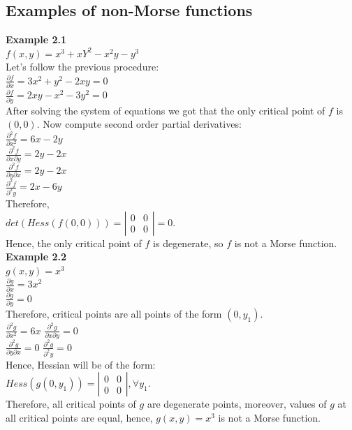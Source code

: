 \documentclass[]{article}
\begin{document}
\subsection{Examples of non-Morse functions} 
\textbf{Example 2.1}\\
$f(x,y)=x^3+xY^2-x^2y-y^3$\\
Let's follow the previous procedure: \\
$\frac{\partial f}{\partial x}=3x^2+y^2-2xy=0$\\
$\frac{\partial f}{\partial y}=2xy-x^2-3y^2=0$\\
After solving the system of equations we got that the only critical point of $f$ is $(0,0)$. Now compute second order partial derivatives:\\
$\frac{\partial^2 f}{\partial x^2}=6x-2y$\\
$\frac{\partial^2 f}{\partial x \partial y}=2y-2x$\\
$\frac{\partial^2 f}{\partial y \partial x}=2y-2x$\\
$\frac{\partial^2 f}{\partial^2 y}=2x-6y$\\
Therefore, \\
$det(Hess(f(0,0)))=\left| \begin{array}{cc} 0 & 0 \\ 0 & 0 \end{array} \right|=0$.\\
Hence, the only critical point of $f$ is degenerate, so $f$ is not a Morse function. \\
\textbf{Example 2.2}\\
$g(x,y)=x^3$\\
$\frac{\partial g}{\partial x}=3x^2$\\
$\frac{\partial g}{\partial y}=0$\\
Therefore, critical points are all points of the form $(0, y_1)$.\\
$\frac{\partial^2 g}{\partial x^2}=6x$
$\frac{\partial^2 g}{\partial x \partial y}=0$\\
$\frac{\partial^2 g}{\partial y \partial x}=0$
$\frac{\partial^2 g}{\partial^2 y}=0$\\
Hence, Hessian will be of the form: \\
$Hess(g(0,y_1))=\left| \begin{array}{cc} 0 & 0 \\ 0 & 0 \end{array} \right|,  \forall y_1$. \\
Therefore, all critical points of $g$ are degenerate points, moreover, values of $g$ at all critical points are equal, hence, $g(x,y)=x^3$ is not a Morse function. 
\end{document}
